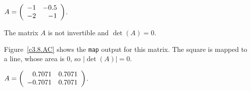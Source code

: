 \documentclass{ximera}
\begin{document}
\begin{computerExercise}  \label{c3.8.AC}
$A=\left(\begin{array}{rr} -1 & -0.5\\ -2 &-1\end{array}\right)$.

\begin{solution}
\ans The matrix $A$ is not invertible and $\det(A) = 0$.

\soln Figure~\ref{c3.8.AC} shows the {\tt map} output for this matrix.
The square is mapped to a line, whose area is $0$, so $|\det(A)| = 0$.


\end{solution}
\end{computerExercise}
\begin{computerExercise}  \label{c3.8.AD}
$A=\left(\begin{array}{rr} 0.7071 & 0.7071\\ -0.7071 &0.7071\end{array}\right)$.
\end{computerExercise}
\end{document}
